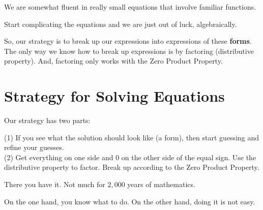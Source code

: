 \documentclass{ximera}
\begin{document}
We are somewhat fluent in really small equations that involve familiar functions.   



Start complicating the equations and we are just out of luck, algebraically. 


So, our strategy is to break up our expressions into expressions of these \textbf{\textcolor{blue!55!black}{forms}}.  The only way we know how to break up expressions is by factoring (distributive property).  And, factoring only works with the Zero Product Property.















\section*{Strategy for Solving Equations}


Our strategy has two parts:


(1) If you see what the solution should look like (a form), then start guessing and refine your guesses.\\
(2) Get everything on one side and $0$ on the other side of the equal sign. Use the distributive property to factor.  Break up according to the Zero Product Property. 




There you have it. Not much for $2,000$ years of mathematics.

On the one hand, you know what to do.  On the other hand, doing it is not easy.
\end{document}
